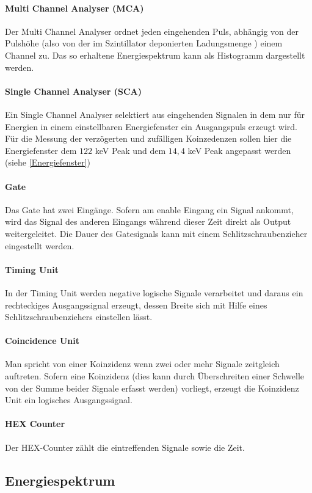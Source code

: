 \documentclass[12pt,listof=totoc]{scrartcl}
\begin{document}
 \paragraph{Multi Channel Analyser (MCA)}
 Der Multi Channel Analyser ordnet jeden eingehenden Puls, abhängig von der Pulshöhe (also von der im Szintillator deponierten Ladungsmenge ) einem Channel zu. Das so erhaltene Energiespektrum kann als Histogramm dargestellt werden.
 \paragraph{Single Channel Analyser (SCA)}
 Ein Single Channel Analyser selektiert aus eingehenden Signalen in dem nur für Energien in einem einstellbaren Energiefenster ein Ausgangspuls erzeugt wird.  Für die Messung der verzögerten und zufälligen Koinzedenzen sollen hier die Energiefenster dem $122$ keV Peak und dem $14,4$ keV Peak angepasst werden (siehe \ref{Energiefenster})
 \paragraph{Gate} Das Gate hat zwei Eingänge. Sofern am enable Eingang ein Signal ankommt, wird das Signal des anderen Eingangs während dieser Zeit direkt als Output weitergeleitet. Die Dauer des Gatesignals kann mit einem Schlitzschraubenzieher eingestellt werden.
 \paragraph{Timing Unit}
 In der Timing Unit werden negative logische Signale verarbeitet und daraus ein rechteckiges Ausgangssignal erzeugt, dessen Breite sich mit Hilfe eines Schlitzschraubenziehers einstellen lässt.
 \paragraph{Coincidence Unit}
 Man spricht von einer Koinzidenz wenn zwei oder mehr Signale zeitgleich auftreten. Sofern eine Koinzidenz (dies kann durch Überschreiten einer Schwelle von der Summe beider Signale erfasst werden) vorliegt, erzeugt die Koinzidenz Unit ein logisches Ausgangssignal.
 \paragraph{HEX Counter}
Der HEX-Counter zählt die eintreffenden Signale sowie die Zeit.

\subsection{Energiespektrum}
\end{document}
